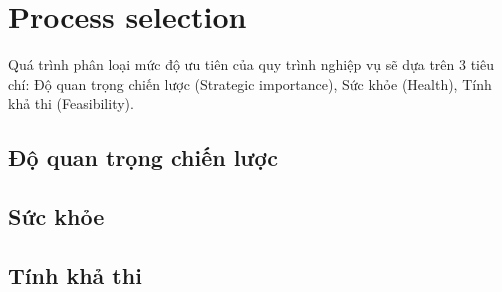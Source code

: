 \section{Process selection}
Quá trình phân loại mức độ ưu tiên của quy trình nghiệp vụ sẽ dựa trên 3 tiêu chí: Độ quan trọng chiến lược (Strategic importance), Sức khỏe (Health), Tính khả thi (Feasibility).

\subsection{Độ quan trọng chiến lược}
    
\subsection{Sức khỏe}
    
\subsection{Tính khả thi}
    